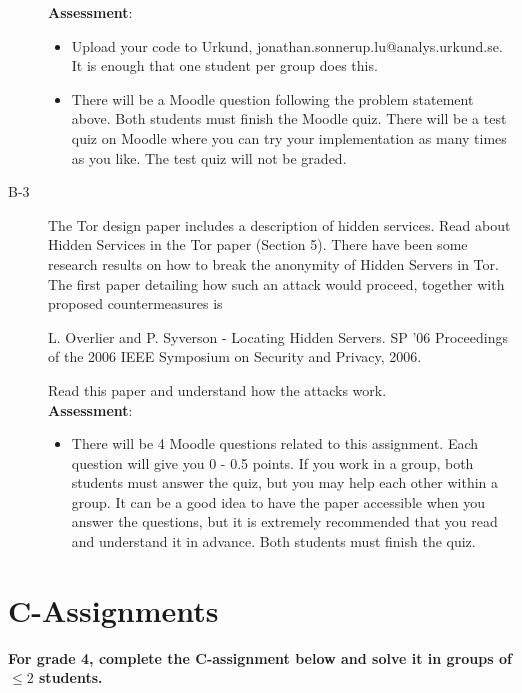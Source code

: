 \documentclass{article}
\begin{document}
\begin{description}
{		\textbf{Assessment}:
	\begin{itemize}
		\item Upload your code to Urkund, jonathan.sonnerup.lu@analys.urkund.se. It is enough that one student per group does this.
		\item There will be a Moodle question following the problem statement above. Both students must finish the Moodle quiz. There will be
			a test quiz on Moodle where you can try your implementation as many times as you like. The test quiz will not be graded.
	\end{itemize}
	}
	

	\item[B-3]{The Tor design paper includes a description of hidden services. Read about Hidden Services in the Tor paper (Section 5). 
		There have been some research results on how to break the anonymity of Hidden Servers in Tor. The first paper detailing how such an attack would proceed, together with proposed countermeasures is 
		\begin{center}
			\begin{minipage}{0.8\textwidth}
				L. Overlier and P. Syverson - Locating Hidden Servers. SP '06 Proceedings of the 2006 IEEE Symposium on Security and Privacy, 2006.
			\end{minipage}
		\end{center}
		Read this paper and understand how the attacks work.\\
	\textbf{Assessment}:
	\begin{itemize}
		\item There will be 4 Moodle questions related to this assignment. Each question will give you 0 - 0.5 points. 
			If you work in a group, both students must answer the quiz, but you may help each other within a group. 
			It can be a good idea to have the paper accessible when you answer the questions, but it is extremely recommended that you read and understand it in advance. 
			Both students must finish the quiz.
	\end{itemize}
	}	

	
	
\end{description}

\clearpage

\section*{C-Assignments}
\textbf{For grade 4, complete the C-assignment below and solve it in groups of $\leq 2$ students.}
\end{document}
